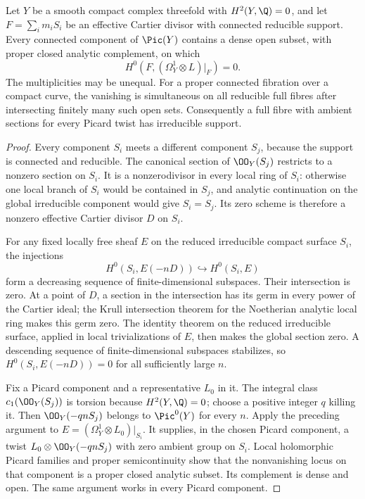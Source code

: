 
\begin{proposition}\label{cdp:st:A.3.5}
Let $Y$ be a smooth compact complex threefold with $H^2(Y,\Q)=0$, and let $F=\sum_i m_iS_i$ be an effective Cartier divisor with connected reducible support. Every connected component of $\Pic(Y)$ contains a dense open subset, with proper closed analytic complement, on which
\[
 H^0(F,(\Omega_Y^1\otimes L)|_F)=0.
 \tag{A.15b}\label{cdp:eq:A.15b}
\]
The multiplicities may be unequal. For a proper connected fibration over a compact curve, the vanishing is simultaneous on all reducible full fibres after intersecting finitely many such open sets. Consequently a full fibre with ambient sections for every Picard twist has irreducible support.
\end{proposition}
\begin{proof}
Every component $S_i$ meets a different component $S_j$, because the support is connected and reducible. The canonical section of $\OO_Y(S_j)$ restricts to a nonzero section on $S_i$. It is a nonzerodivisor in every local ring of $S_i$: otherwise one local branch of $S_i$ would be contained in $S_j$, and analytic continuation on the global irreducible component would give $S_i=S_j$. Its zero scheme is therefore a nonzero effective Cartier divisor $D$ on $S_i$.

For any fixed locally free sheaf $E$ on the reduced irreducible compact surface $S_i$, the injections
\[
 H^0(S_i,E(-nD))\hookrightarrow H^0(S_i,E)
\]
form a decreasing sequence of finite-dimensional subspaces. Their intersection is zero. At a point of $D$, a section in the intersection has its germ in every power of the Cartier ideal; the Krull intersection theorem for the Noetherian analytic local ring makes this germ zero. The identity theorem on the reduced irreducible surface, applied in local trivializations of $E$, then makes the global section zero. A descending sequence of finite-dimensional subspaces stabilizes, so $H^0(S_i,E(-nD))=0$ for all sufficiently large $n$.

Fix a Picard component and a representative $L_0$ in it. The integral class $c_1(\OO_Y(S_j))$ is torsion because $H^2(Y,\Q)=0$; choose a positive integer $q$ killing it. Then $\OO_Y(-qnS_j)$ belongs to $\Pic^0(Y)$ for every $n$. Apply the preceding argument to $E=(\Omega_Y^1\otimes L_0)|_{S_i}$. It supplies, in the chosen Picard component, a twist $L_0\otimes\OO_Y(-qnS_j)$ with zero ambient group on $S_i$. Local holomorphic Picard families and proper semicontinuity show that the nonvanishing locus on that component is a proper closed analytic subset. Its complement is dense and open. The same argument works in every Picard component.


\end{proof}
